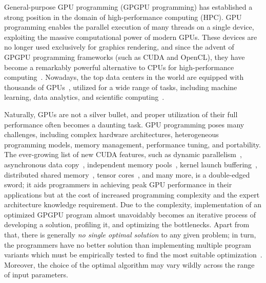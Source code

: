 
General-purpose GPU programming (GPGPU programming) has established a strong position in the domain of high-performance computing (HPC).
GPU programming enables the parallel execution of many threads on a single device, exploiting the massive computational power of modern GPUs.
These devices are no longer used exclusively for graphics rendering, and since the advent of GPGPU programming frameworks (such as CUDA and OpenCL), they have become a remarkably powerful alternative to CPUs for high-performance computing~\cite{khairy2019survey}.
Nowadays, the top data centers in the world are equipped with thousands of GPUs~\cite{top500}, utilized for a wide range of tasks, including machine learning, data analytics, and scientific computing~\cite{mittal2019survey,bress2014gpu,kalaiselvi2017survey}.

Naturally, GPUs are not a silver bullet, and proper utilization of their full performance often becomes a daunting task.
GPU programming poses many challenges, including complex hardware architectures, heterogeneous programming models, memory management, performance tuning, and portability.
The ever-growing list of new CUDA features, such as dynamic parallelism~\cite{wang2014characterization}, asynchronous data copy~\cite{pearson2019evaluating}, independent memory pools~\cite{qian2023empirical}, kernel launch buffering~\cite{lin2021efficient}, distributed shared memory~\cite{choquette2023nvidia}, tensor cores~\cite{dakkak2019accelerating}, and many more, is a double-edged sword;
it aids programmers in achieving peak GPU performance in their applications but at the cost of increased programming complexity and the expert architecture knowledge requirement.
Due to the complexity, implementation of an optimized GPGPU program almost unavoidably becomes an iterative process of developing a solution, profiling it, and optimizing the bottlenecks.
Apart from that, there is generally \emph{no single optimal solution} to any given problem; in turn, the programmers have no better solution than implementing multiple program variants which must be empirically tested to find the most suitable optimization~\cite{hijma2023optimization}. Moreover, the choice of the optimal algorithm may vary wildly across the range of input parameters.

